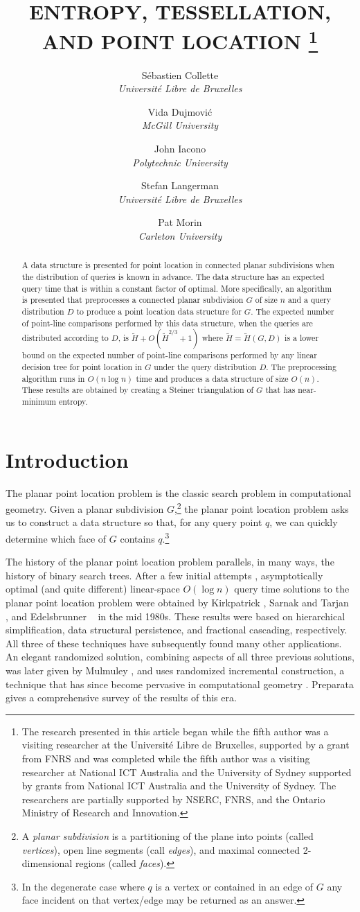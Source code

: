 \documentclass[lotsofwhite]{patmorin}
\title{\MakeUppercase{Entropy, Tessellation, and Point Location}%
	\thanks{The research presented in this article began
while the fifth author was a visiting researcher at the Universit\'e Libre de
Bruxelles, supported by a grant from FNRS and was completed while
 the fifth author was a visiting researcher at National ICT 
Australia and the University of
Sydney supported by grants from National ICT Australia and the
University of Sydney.  The researchers are
partially supported by NSERC, FNRS, and the Ontario Ministry of Research and
Innovation.}}
\author{S\'ebastien Collette \\ \textit{Universit\'e Libre de Bruxelles}
  \and Vida Dujmovi\'c \\ \textit{McGill University}
  \and John Iacono \\ \textit{Polytechnic University}
  \and Stefan Langerman \\ \textit{Universit\'e Libre de Bruxelles}
  \and Pat Morin \\ \textit{Carleton University}}
\begin{document}
\maketitle

\begin{abstract} 
A data structure is presented for point location in connected planar
subdivisions when the distribution of queries is known in advance.
The data structure has an expected query time that is within a
constant factor of optimal.  More specifically, an algorithm is
presented that preprocesses a connected planar subdivision $G$ of size
$n$ and a query distribution $D$ to produce a point location data
structure for $G$. The expected number of point-line comparisons
performed by this data structure, when the queries are distributed
according to $D$, is $\tilde H + O(\tilde H^{2/3}+1)$ where $\tilde
H=\tilde H(G,D)$ is a lower bound on the expected number of point-line
comparisons performed by any linear decision tree for point location
in $G$ under the query distribution $D$.  The preprocessing algorithm
runs in $O(n\log n)$ time and produces a data structure of size
$O(n)$.  These results are obtained by creating a Steiner
triangulation of $G$ that has near-minimum entropy.
\end{abstract}

\section{Introduction}

The planar point location problem is the classic search problem in
computational geometry. Given a planar subdivision $G$,\footnote{A
\emph{planar subdivision} is a partitioning of the plane into points
(called \emph{vertices}), open line segments (call \emph{edges}), and
maximal connected 2-dimensional regions (called \emph{faces}).} the
planar point location problem asks us to construct a data structure so
that, for any query point $q$, we can quickly determine which face of
$G$ contains $q$.\footnote{In the degenerate case where $q$ is a
vertex or contained in an edge of $G$ any face incident on that
vertex/edge may be returned as an answer.}

The history of the planar point location problem parallels, in many
ways, the history of binary search trees.  After a few initial attempts
\cite{dl76,lp77,p81}, asymptotically optimal (and quite different)
linear-space $O(\log n)$ query time solutions to the planar point
location problem were obtained by Kirkpatrick \cite{k83}, Sarnak and
Tarjan \cite{st86}, and Edelsbrunner \etal\ \cite{egs86} in the mid
1980s.  These results were based on hierarchical simplification, data
structural persistence, and fractional cascading, respectively.  All
three of these techniques have subsequently found many other
applications.  An elegant randomized solution, combining aspects of
all three previous solutions, was later given by Mulmuley \cite{m90},
and uses randomized incremental construction, a technique that has
since become pervasive in computational geometry
\cite[Section~9.5]{bcko08}.  Preparata \cite{p90} gives a
comprehensive survey of the results of this era.
\end{document}
